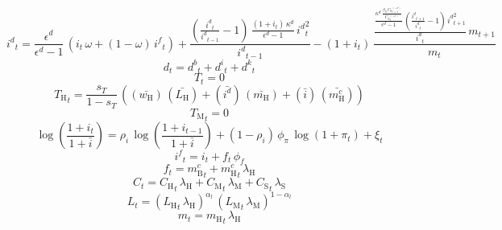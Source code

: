 \begin{dmath}
{i^d}_{t}=\frac{{\epsilon^d}}{{\epsilon^d}-1}\, \left({i}_{t}\, {\omega}+\left(1-{\omega}\right)\, {i^f}_{t}\right)+\frac{\left(\frac{{i^d}_{t}}{{i^d}_{t-1}}-1\right)\, \frac{\left(1+{i}_{t}\right)\, {\kappa^d}}{{\epsilon^d}-1}\, {i^d}_{t}^{2}}{{i^d}_{t-1}}-\left(1+{i}_{t}\right)\, \frac{\frac{\frac{{\kappa^d}\, \frac{{\beta_\mathrm{S}}\, {C_\mathrm{S}}_{t+1}^{\left(-{\sigma}\right)}}{{C_\mathrm{S}}_{t}^{\left(-{\sigma}\right)}}}{{\epsilon^d}-1}\, \left(\frac{{i^d}_{t+1}}{{i^d}_{t}}-1\right)\, {i^d}_{t+1}^{2}}{{i^d}_{t}}\, {m}_{t+1}}{{m}_{t}}
\end{dmath}
\begin{dmath}
{d}_{t}={d^b}_{t}+{d^i}_{t}+{d^k}_{t}
\end{dmath}
\begin{dmath}
{T}_{t}=0
\end{dmath}
\begin{dmath}
{T_\mathrm{H}}_{t}=\frac{{s_T}}{1-{s_T}}\, \left((\bar{w_\mathrm{H}})\, (\bar{L_\mathrm{H}})+(\bar{i^d})\, (\bar{m_\mathrm{H}})+(\bar{i})\, (\bar{m^c_\mathrm{H}})\right)
\end{dmath}
\begin{dmath}
{T_\mathrm{M}}_{t}=0
\end{dmath}
\begin{dmath}
\log\left(\frac{1+{i}_{t}}{1+{\bar{i}}}\right)={\rho_i}\, \log\left(\frac{1+{i}_{t-1}}{1+{\bar{i}}}\right)+\left(1-{\rho_i}\right)\, {\phi_\pi}\, \log\left(1+{\pi}_{t}\right)+{\xi}_{t}
\end{dmath}
\begin{dmath}
{i^f}_{t}={i}_{t}+{f}_{t}\, {\phi_f}
\end{dmath}
\begin{dmath}
{f}_{t}={m^c_\mathrm{B}}_{t}+{m^c_\mathrm{H}}_{t}\, {\lambda_\mathrm{H}}
\end{dmath}
\begin{dmath}
{C}_{t}={C_\mathrm{H}}_{t}\, {\lambda_\mathrm{H}}+{C_\mathrm{M}}_{t}\, {\lambda_\mathrm{M}}+{C_\mathrm{S}}_{t}\, {\lambda_\mathrm{S}}
\end{dmath}
\begin{dmath}
{L}_{t}=\left({L_\mathrm{H}}_{t}\, {\lambda_\mathrm{H}}\right)^{{\alpha_l}}\, \left({L_\mathrm{M}}_{t}\, {\lambda_\mathrm{M}}\right)^{1-{\alpha_l}}
\end{dmath}
\begin{dmath}
{m}_{t}={m_\mathrm{H}}_{t}\, {\lambda_\mathrm{H}}
\end{dmath}
